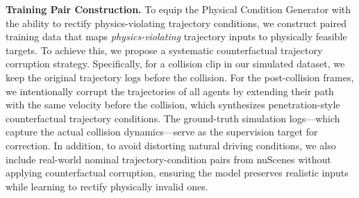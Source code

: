 \documentclass[runningheads]{llncs}
\begin{document}
\setlength{\parskip}{1pt}
\noindent \textbf{Training Pair Construction.}  To equip the Physical Condition Generator with the ability to rectify physics-violating trajectory conditions, we construct paired training data that maps \emph{physics-violating} trajectory inputs to physically feasible targets. To achieve this, we propose a systematic counterfactual trajectory corruption strategy. Specifically, for a collision clip in our simulated  dataset, we keep the original trajectory logs before the collision. For the post-collision frames, we intentionally corrupt the trajectories of all agents by extending their path with the same velocity before the collision, which synthesizes penetration-style counterfactual trajectory conditions. The ground-truth simulation logs---which capture the actual collision dynamics---serve as the supervision target for correction. In addition, to avoid distorting natural driving conditions, we also include real-world nominal trajectory-condition pairs from nuScenes without applying counterfactual corruption, ensuring the model preserves realistic inputs while learning to rectify physically invalid ones.




\end{document}

